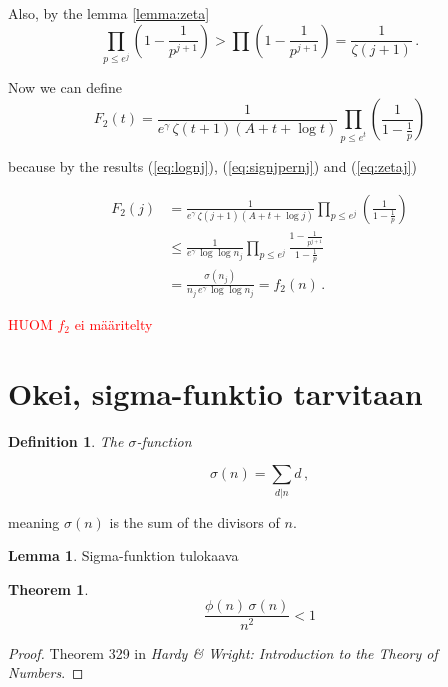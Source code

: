 \documentclass{article}
\theoremstyle{definition}
\newtheorem{definition}[subsection]{Definition}
\newtheorem{lemma}[subsubsection]{Lemma}
\newtheorem{theorem}[subsection]{Theorem}
\begin{document}
Also, by the lemma \ref{lemma:zeta}
\begin{equation}
\label{eq:zetaj}
    \prod_{p\leq e^j}\left(1-\frac{1}{p^{j+1}}\right) > \prod \left(1-\frac{1}{p^{j+1}}\right) = \frac{1}{\zeta(j+1)}\,.
\end{equation}

Now we can define
\begin{equation*}
    F_2(t)=\frac{1}{e^\gamma\,\zeta(t+1)(A+t+\log t)} \prod_{p\leq e^t} \left(\frac{1}{1-\frac{1}{p}}\right)
\end{equation*}

because by the results (\ref{eq:lognj}), (\ref{eq:signjpernj}) and (\ref{eq:zetaj})

\begin{align*}
    F_2(j)& = \frac{1}{e^\gamma\,\zeta(j+1)(A+t+\log j)} \prod_{p\leq e^j} \left(\frac{1}{1-\frac{1}{p}}\right)\\
    & \leq \frac{1}{e^\gamma\,\log \log n_j} \prod_{p\leq e^j} \frac{1-\frac{1}{p^{j+1}}}{1-\frac{1}{p}}\\
    & = \frac{\sigma(n_j)}{n_j\,e^\gamma\,\log \log n_j} = f_2(n)\,.
\end{align*}

\textcolor{red}{HUOM $f_2$ ei määritelty}

\section{Okei, sigma-funktio tarvitaan}

\begin{definition}{\emph{The $\sigma$-function}}

\begin{equation*}
    \sigma(n)=\sum_{d\vert n} d\,,
\end{equation*}

meaning $\sigma(n)$ is the sum of the divisors of $n$.
\end{definition}

\begin{lemma}
\label{lemma:sigma}
Sigma-funktion tulokaava
\end{lemma}

\begin{theorem}
\begin{equation*}
    \frac{\phi(n)\,\sigma(n)}{n^2}<1
\end{equation*}

\begin{proof}
Theorem 329 in \textit{Hardy \& Wright: Introduction to the Theory of Numbers}.
\end{proof}
\end{theorem}
\end{document}
